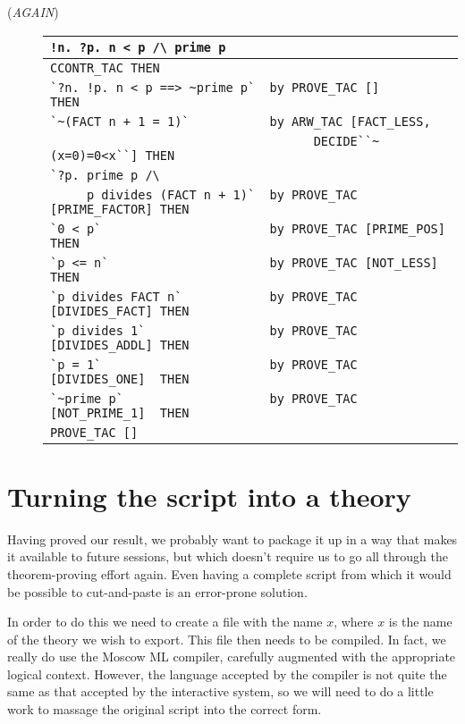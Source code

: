 \begin{description}
\item [\small{({\it AGAIN\/})}]
\begin{tabular}[t]{l}
\verb+!n. ?p. n < p /\ prime p+ \\ \hline
\verb|CCONTR_TAC THEN | \\
\verb|`?n. !p. n < p ==> ~prime p`  by PROVE_TAC []             THEN| \\
\verb|`~(FACT n + 1 = 1)`           by ARW_TAC [FACT_LESS,| \\
\verb|                                    DECIDE``~(x=0)=0<x``] THEN| \\
\verb|`?p. prime p /\  | \\
\verb|     p divides (FACT n + 1)`  by PROVE_TAC [PRIME_FACTOR] THEN| \\
\verb|`0 < p`                       by PROVE_TAC [PRIME_POS]    THEN| \\
\verb|`p <= n`                      by PROVE_TAC [NOT_LESS]     THEN| \\
\verb|`p divides FACT n`            by PROVE_TAC [DIVIDES_FACT] THEN| \\
\verb|`p divides 1`                 by PROVE_TAC [DIVIDES_ADDL] THEN| \\
\verb|`p = 1`                       by PROVE_TAC [DIVIDES_ONE]  THEN| \\
\verb|`~prime p`                    by PROVE_TAC [NOT_PRIME_1]  THEN| \\
\verb|PROVE_TAC []| \\
\end{tabular}
\end{description}

\section{Turning the script into a theory}
\label{sec:script-to-theory}

Having proved our result, we probably want to package it up in a way
that makes it available to future sessions, but which doesn't require
us to go all through the theorem-proving effort again.  Even having a
complete script from which it would be possible to cut-and-paste is an
error-prone solution.

In order to do this we need to create a file with the name
$x$, where $x$ is the name of the theory we wish to
export.  This file then needs to be compiled.  In fact, we really do
use the Moscow ML compiler, carefully augmented with the appropriate
logical context.  However, the language accepted by the compiler is
not quite the same as that accepted by the interactive system, so we
will need to do a little work to massage the original script into the
correct form.

